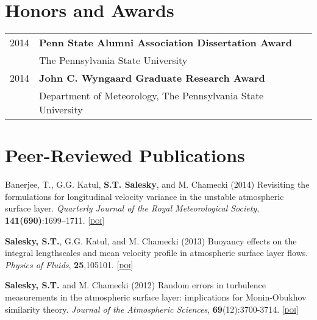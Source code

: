 \documentclass[11pt,letterpaper]{article}
\begin{document}
\section*{Honors and Awards} 
\begin{tabular}{l l}
2014 & \textbf{Penn State Alumni Association Dissertation Award} \\
     & The Pennsylvania State University \\[1.5\parskip]

2014 & \textbf{John C. Wyngaard Graduate Research Award} \\
     & Department of Meteorology, The Pennsylvania State University \\


\end{tabular}

\section*{Peer-Reviewed Publications} 

Banerjee, T., G.G. Katul, \textbf{S.T. Salesky}, and M. Chamecki (2014) Revisiting the formulations for longitudinal velocity variance in the unstable atmospheric surface layer. \textit{Quarterly Journal of the Royal Meteorological Society}, \textbf{141(690)}:1699--1711. [\href{http://doi.org/10.1002/qj.2472}{\textsc{doi}}] 

\textbf{Salesky, S.T.}, G.G. Katul, and M. Chamecki (2013) Buoyancy effects on the integral lengthscales and mean velocity profile in atmospheric surface layer flows. \textit{Physics of Fluids}, \textbf{25},105101. [\href{http://doi.org/10.1063/1.4823747}{\textsc{doi}}]

\textbf{Salesky, S.T.} and M. Chamecki (2012) Random errors in turbulence measurements in the atmospheric surface layer: implications for Monin-Obukhov similarity theory. \textit{Journal of the Atmospheric Sciences}, \textbf{69}(12):3700-3714. [\href{http://doi.org/10.1175/JAS-D-12-096.1}{\textsc{doi}}]
\end{document}
